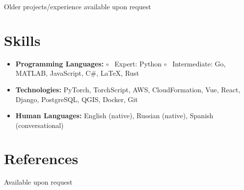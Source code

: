 \documentclass[letterpaper,11pt]{article}
\makeatletter
\newcommand{\resumeItem}[2]{
  \item\small{
    \textbf{#1}{#2 \vspace{-2pt}}
  }
}
\newcommand{\resumeSubheading}[6]{
  \vspace{-1pt}\item
    \begin{tabular*}{0.97\textwidth}{l@{\extracolsep{\fill}}r}
      \textbf{#1} & #2
      \ifthenelse{\equal{#3}{}}{}{
        \\ \textit{\small#3} & \textit{\small #4}
      } 
      \ifthenelse{\equal{#5}{}}{}{
        \\ \textit{\small Topic: #5}
      }
      \ifthenelse{\equal{#6}{}}{}{
         & \textit{\small GPA: #6}
      }
    \end{tabular*}\vspace{-5pt}
}
\newcommand{\resumeSubItem}[2]{\resumeItem{#1}{#2}\vspace{-4pt}}
\renewcommand{\labelitemii}{$\circ$}
\newcommand{\resumeSubHeadingListStart}{\begin{itemize}[leftmargin=*]}
\newcommand{\resumeSubHeadingListEnd}{\end{itemize}}
\newcommand{\resumeItemListStart}{\begin{itemize}}
\newcommand{\resumeItemListEnd}{\end{itemize}\vspace{-5pt}}
\makeatother
\begin{document}

  Older projects/experience available upon request



\section{Skills}
 \resumeSubHeadingListStart
   \item \textbf{Programming Languages:}
   \subitem \labelitemii~ Expert: Python
   \subitem \labelitemii~ Intermediate: Go, MATLAB, JavaScript, C\#, \LaTeX, Rust
   \item \textbf{Technologies:}{ PyTorch, TorchScript, AWS, CloudFormation, Vue, React, Django, PostgreSQL, QGIS, Docker, Git}
   \item \textbf{Human Languages:}{ English (native), Russian (native), Spanish (conversational)}
 \resumeSubHeadingListEnd

\section{References}
Available upon request
\end{document}
